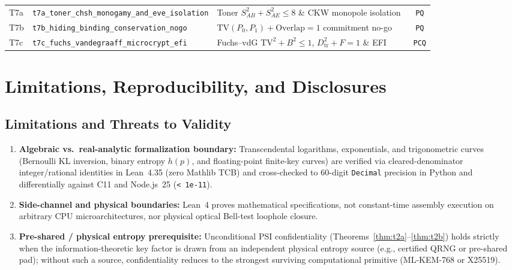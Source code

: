 \documentclass[11pt,reqno]{amsart}
\theoremstyle{definition}
\newcommand{\code}[1]{\texttt{\small #1}}
\begin{document}
\begin{table}[t]
\begin{tabularx}{\linewidth}{@{}l l Y c@{}}
T7a & \code{t7a\_toner\_chsh\_monogamy\_and\_eve\_isolation} & Toner $S_{AB}^2{+}S_{AE}^2 \le 8$ \& CKW monopole isolation~\cite{toner2009,ckw2000} & \code{PQ} \\
T7b & \code{t7b\_hiding\_binding\_conservation\_nogo} & $\mathrm{TV}(P_0,P_1){+}\mathrm{Overlap}=1$ commitment no-go~\cite{mayers1997} & \code{PQ} \\
T7c & \code{t7c\_fuchs\_vandegraaff\_microcrypt\_efi} & Fuchs--vdG $\mathrm{TV}^2{+}B^2\le 1$, $D_{\mathrm{tr}}^2{+}F=1$ \& EFI~\cite{fuchs1999,brakerski2023efi} & \code{PCQ} \\
\bottomrule
\end{tabularx}
\end{table}

\FloatBarrier
\section{Limitations, Reproducibility, and Disclosures}
\label{sec:disclosures}

\subsection*{Limitations and Threats to Validity}
\begin{enumerate}[leftmargin=1.8em]
  \item \textbf{Algebraic vs.\ real-analytic formalization boundary:} Transcendental logarithms, exponentials, and trigonometric curves (Bernoulli KL inversion, binary entropy $h(p)$, and floating-point finite-key curves) are verified via cleared-denominator integer/rational identities in Lean~4.35 (zero Mathlib TCB) and cross-checked to $60$-digit \code{Decimal} precision in Python and differentially against C11 and Node.js~25 (\code{< 1e-11}).
  \item \textbf{Side-channel and physical boundaries:} Lean~4 proves mathematical specifications, not constant-time assembly execution on arbitrary CPU microarchitectures, nor physical optical Bell-test loophole closure.
  \item \textbf{Pre-shared / physical entropy prerequisite:} Unconditional PSI confidentiality (Theorems~\ref{thm:t2a}--\ref{thm:t2b}) holds strictly when the information-theoretic key factor is drawn from an independent physical entropy source (e.g., certified QRNG or pre-shared pad); without such a source, confidentiality reduces to the strongest surviving computational primitive (ML-KEM-768 or X25519).
\end{enumerate}
\end{document}
